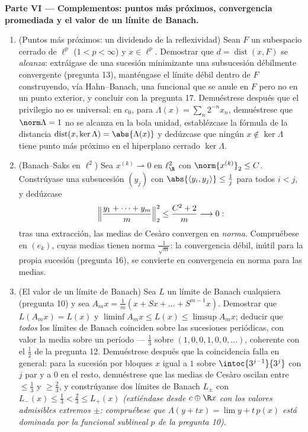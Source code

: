 \begin{problem}[{Problema de fin de semana --- $(\ell^p)' = \ell^q$,
reflexividad y la rareza de $\ell^\infty$}]
\medskip
\noindent\textbf{Parte VI --- Complementos: puntos más próximos,
convergencia promediada y el valor de un límite de Banach.}
\begin{enumerate}[resume]
  \item (Puntos más próximos: un dividendo de la reflexividad) Sean $F$
  un subespacio cerrado de $\ell^p$ ($1 < p < \infty$) y $x \in \ell^p$.
  Demostrar que $d = \operatorname{dist}(x,
        F)$ se \emph{alcanza}: extráigase de una sucesión minimizante
  una subsucesión débilmente convergente (pregunta 13), manténgase el
  límite débil dentro de $F$ construyendo, vía Hahn--Banach, una
  funcional que se anule en $F$ pero no en un punto exterior, y concluir
  con la pregunta 17. Demuéstrese después que el privilegio no es
  universal: en $c_0$, para $\Lambda(x) = \sum_n2^{-n}x_n$, demuéstrese
  que $\norm\Lambda = 1$ no se alcanza en la bola unidad, establézcase
  la fórmula de la distancia $\operatorname{dist}(x, \ker\Lambda) =
        \abs{\Lambda(x)}$ y dedúzcase que ningún $x \notin
        \ker\Lambda$ tiene punto más próximo en el hiperplano cerrado
  $\ker\Lambda$. \item (Banach--Saks en $\ell^2$) Sea $x^{(k)}
        \rightharpoonup 0$ en $\ell^2_{\R}$ con
  $\norm{x^{(k)}}_2 \leq C$. Constrúyase una subsucesión $(y_j)$ con
  $\abs{\langle y_i, y_j\rangle} \leq
        \frac1j$ para todos $i < j$, y dedúzcase
        \[
        \Bigl\lVert\frac{y_1 + \dots + y_m}m\Bigr\rVert_2^2
        \leq \frac{C^2 + 2}m \longrightarrow 0 :
        \]
        tras una extracción, las medias de Cesàro convergen en
        \emph{norma}. Compruébese en $(e_k)$, cuyas medias tienen norma
        $\frac1{\sqrt m}$: la convergencia débil, inútil para la propia
        sucesión (pregunta 16), se convierte en convergencia en norma
        para las medias. \item (El valor de un límite de Banach) Sea $L$
        un límite de Banach cualquiera (pregunta 10) y sea
        $A_mx = \frac1m(x + Sx + \dots
        + S^{m-1}x)$. Demostrar que $L(A_mx) = L(x)$ y $\liminf A_mx
        \leq L(x) \leq \limsup A_mx$; deducir que \emph{todos} los
        límites de Banach coinciden sobre las sucesiones periódicas, con
        valor la media sobre un período --- $\frac13$ sobre
        $(1, 0, 0, 1,
        0, 0, \dots)$, coherente con el $\frac12$ de la pregunta 12.
        Demuéstrese después que la coincidencia falla en general: para
        la sucesión por bloques $x$ igual a $1$ sobre
        $\intoc{3^{j-1}}{3^j}$ con $j$ par y a $0$ en el resto,
        demuéstrese que las medias de Cesàro oscilan entre $\leq
        \frac13$ y $\geq \frac23$, y constrúyanse dos límites de Banach
        $L_\pm$ con $L_-(x) \leq \frac13 < \frac23
        \leq L_+(x)$ \emph{(extiéndase desde $c \oplus \R x$ con los
        valores admisibles extremos $\pm$: compruébese que
        $\Lambda(y + tx) = \lim y + t\,p(x)$ está dominada por la
        funcional sublineal $p$ de la pregunta 10)}.
\end{enumerate}
\end{problem}
